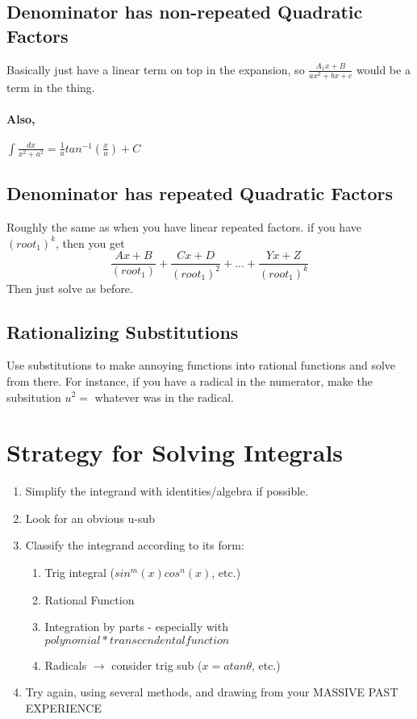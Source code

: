 \documentclass[a4paper,12pt]{report}
\begin{document}
\subsection{Denominator has non-repeated Quadratic Factors}
Basically just have a linear term on top in the expansion, so $\frac{A_1x+B}{ax^2+bx+c}$ would be a term in the thing.

\paragraph{Also, } $\int\frac{dx}{x^2+a^2} = \frac{1}{a}tan^{-1}(\frac{x}{a})+C$

\subsection{Denominator has repeated Quadratic Factors}
Roughly the same as when you have linear repeated factors. if you have $(root_1)^k$, then you get $$\frac{Ax+B}{(root_1)} + \frac{Cx+D}{(root_1)^2} + ... + \frac{Yx+Z}{(root_1)^k}$$
Then just solve as before.

\subsection{Rationalizing Substitutions}
Use substitutions to make annoying functions into rational functions and solve from there. For instance, if you have a radical in the numerator, make the subsitution $u^2 = $ whatever was in the radical.

\section{Strategy for Solving Integrals}
\begin{enumerate}
\item Simplify the integrand with identities/algebra if possible.
\item Look for an obvious u-sub
\item Classify the integrand according to its form:
\begin{enumerate}
\item Trig integral ($sin^m(x)cos^n(x)$, etc.)
\item Rational Function
\item Integration by parts - especially with $polynomial * transcendental function$
\item Radicals $\to$ consider trig sub ($x = atan\theta$, etc.)
\end{enumerate}
\item Try again, using several methods, and drawing from your MASSIVE PAST EXPERIENCE

\end{enumerate}
\end{document}
